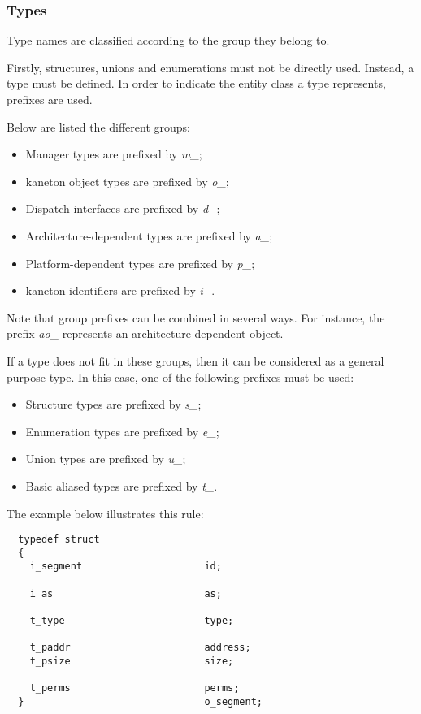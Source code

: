 
\subsubsection{Types}

Type names are classified according to the group they belong to.

Firstly, structures, unions and enumerations must not be directly used.
Instead, a type must be defined. In order to indicate the entity class a type
represents, prefixes are used.

Below are listed the different groups:

\begin{itemize}
  \item
    Manager types are prefixed by \textit{m\_};
  \item
    kaneton object types are prefixed by \textit{o\_};
  \item
    Dispatch interfaces are prefixed by \textit{d\_};
  \item
    Architecture-dependent types are prefixed by \textit{a\_};
  \item
    Platform-dependent types are prefixed by \textit{p\_};
  \item
    kaneton identifiers are prefixed by \textit{i\_}.
\end{itemize}

Note that group prefixes can be combined in several ways. For instance,
the prefix \textit{ao\_} represents an architecture-dependent object.

If a type does not fit in these groups, then it can be considered as a
general purpose type. In this case, one of the following prefixes must be used:

\begin{itemize}
  \item
    Structure types are prefixed by \textit{s\_};
  \item
    Enumeration types are prefixed by \textit{e\_};
  \item
    Union types are prefixed by \textit{u\_};
  \item
    Basic aliased types are prefixed by \textit{t\_}.
\end{itemize}

The example below illustrates this rule:

\begin{verbatim}
  typedef struct
  {
    i_segment                     id;

    i_as                          as;

    t_type                        type;

    t_paddr                       address;
    t_psize                       size;

    t_perms                       perms;
  }                               o_segment;
\end{verbatim}

